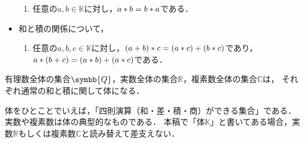 \documentclass[../sotsu.tex]{subfiles}
\begin{document}
\begin{definition}[体]
\begin{itemize}
\begin{enumerate}[resume]
            \item \label{field:prod-commutative} 任意の$a, b \in 𝕂$に対し，$a \mathbin{\ast} b = b \mathbin{\ast} a$である．
        \end{enumerate}
        \item 和と積の関係について，
        \begin{enumerate}[resume]
            \item \label{field:distributive} 任意の$a, b, c \in 𝕂$に対し，$(a + b) \mathbin{\ast} c = (a \mathbin{\ast} c) + (b \mathbin{\ast} c)$であり，$a \mathbin{\ast} (b + c) = (a \mathbin{\ast} b) + (a \mathbin{\ast} c)$である．
        \end{enumerate}    
    \end{itemize}
\end{definition}

\begin{example}
    有理数全体の集合$\symbb{Q}$，実数全体の集合$ℝ$，複素数全体の集合$ℂ$は，
    それぞれ通常の和と積に関して体になる．
\end{example}

体をひとことでいえば，「四則演算（和・差・積・商）ができる集合」である．
実数や複素数は体の典型的なものである．
本稿で「体$𝕂$」と書いてある場合，実数$ℝ$もしくは複素数$ℂ$と読み替えて差支えない．
\end{document}
